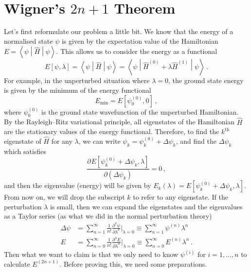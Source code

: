 \documentclass{article}
\theoremstyle{plain}\theoremheaderfont{\normalfont\itshape}\theorembodyfont{\rmfamily}\theoremseparator{.}\newtheorem*{rem}{Remark}\newtheorem*{ex}{Example}\newtheorem*{proof}{Proof}\newtheorem*{altp}{Alternative proof}
\theoremstyle{plain}\theoremheaderfont{\normalfont\bfseries}\theorembodyfont{\rmfamily}\theoremseparator{.}\newtheorem{thm}{Theorem}[section]\newtheorem{lem}[thm]{Lemma}\newtheorem{prop}[thm]{Proposition}\newtheorem*{cor}{Corollary}\newtheorem{defn}[thm]{Definition}\newtheorem{clm}[thm]{Claim}\newtheorem{clminproof}{Claim}
\theoremstyle{break}\theoremheaderfont{\normalfont\itshape}\theorembodyfont{\rmfamily}\theoremseparator{.\medskip}\newtheorem*{proofskip}{Proof}\newtheorem*{exs}{Examples}\newtheorem*{rems}{Remarks}
\theoremstyle{break}\theoremheaderfont{\normalfont\bfseries}\theorembodyfont{\rmfamily}\theoremseparator{.\medskip}\newtheorem{lemskip}[thm]{Lemma}\newtheorem{defnskip}[thm]{Definition}\newtheorem{propskip}[thm]{Proposition}\newtheorem{thmskip}[thm]{Theorem}
\numberwithin{equation}{section}
\newcommand{\pdv}[3][]{\frac{\partial^{#1} #2}{{\partial #3}^{#1}}}
\newcommand{\expval}[2]{\left\langle #2 \middle| #1 \middle| #2 \right\rangle}
\begin{document}
    \section{Wigner's \texorpdfstring{\(2n+1\)}{2n+1} Theorem}\label{Appendix:Wigner}
    Let's first reformulate our problem a little bit. We know that the energy of a normalised state \(\psi\) is given by the expectation value of the Hamiltonian \(E=\expval{\hat{H}}{\psi}\). This allows us to consider the energy as a functional
    \begin{equation}
        E[\psi,\lambda]=\expval{\hat{H}}{\psi}=\expval{\hat{H}^{(0)}+\lambda\hat{H}^{(1)}}{\psi}\,.
    \end{equation}
    For example, in the unperturbed situation where \(\lambda=0\), the ground state energy is given by the minimum of the energy functional
    \begin{equation}
        E_{\text{min}}=E[\psi_0^{(0)},0]\,,
    \end{equation}
    where \(\psi_0^{(0)}\) is the ground state wavefunction of the unperturbed Hamiltonian. By the Rayleigh--Ritz variational principle, all eigenstates of the Hamiltonian \(\hat{H}\) are the stationary values of the energy functional. Therefore, to find the \(k^{\text{th}}\) eigenstate of \(\hat{H}\) for any \(\lambda\), we can write \(\psi_k=\psi_k^{(0)}+\Delta\psi_k\), and find the \(\Delta\psi_k\) which satisfies
    \begin{equation}
        \pdv{E[\psi_k^{(0)}+\Delta\psi_k,\lambda]}{(\Delta\psi_k)}=0\,,
    \end{equation}
    and then the eigenvalue (energy) will be given by \(E_k(\lambda)=E[\psi_k^{(0)}+\Delta\psi_k,\lambda]\). From now on, we will drop the subscript \(k\) to refer to any eigenstate. If the perturbation \(\lambda\) is small, then we can expand the eigenstates and the eigenvalues as a Taylor series (as what we did in the normal perturbation theory)
    \begin{align}
        \Delta\psi&=\sum_{n=1}^{\infty}\frac{1}{n!}\pdv[n]{\psi}{\lambda}\bigg|_{\lambda=0}\equiv\sum_{n=1}^{\infty}\psi^{(n)}\lambda^n \label{delta_psi_expansion}\\
        E&=\sum_{n=0}^{\infty}\frac{1}{n!}\pdv[n]{E}{\lambda}\bigg|_{\lambda=0}\equiv \sum_{n=0}^{\infty}E^{(n)}\lambda^n\,.
    \end{align}
    Then what we want to claim is that we only need to know \(\psi^{(i)}\) for \(i=1,\dots,n\) to calculate \(E^{(2n+1)}\). Before proving this, we need some preparations.
\end{document}
